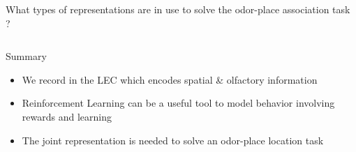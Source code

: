 \documentclass[bigger]{beamer}
\begin{document}
\begin{frame}[label={sec:org8f938e3}]{What types of representations are in use to solve the odor-place association task ?}
\begin{columns}
\begin{column}[t]{0.5\columnwidth}
\end{column}
\end{columns}
\end{frame}

\begin{frame}[<+->][label={sec:orgb96c776}]{Summary}
\begin{itemize}
\item We record in the LEC which encodes spatial \& olfactory information
\item Reinforcement Learning can be a useful tool to model behavior involving rewards and learning
\item The joint representation is needed to solve an odor-place location task
\end{itemize}
\end{frame}
\end{document}
